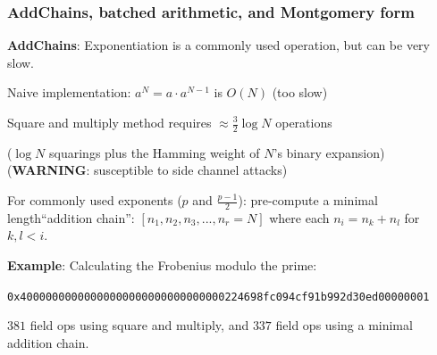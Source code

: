 \documentclass[options]{beamer}
\begin{document}
\begin{frame}[fragile]
    \frametitle{AddChains, batched arithmetic, and Montgomery form}

    {\bf AddChains}: Exponentiation is a commonly used operation, but can be very slow.

    Naive implementation: $a ^ N = a \cdot a^ {N -1}$ is $O(N)$ (too slow)

    \pause
    \vspace{6pt}

    Square and multiply method requires $\approx \frac{3}{2} \log N$ operations

    ($\log N$ squarings plus the Hamming weight of $N$'s binary expansion)
    ({\bf WARNING}: susceptible to side channel attacks)

    \pause
    \vspace{6pt}

    For commonly used exponents ($p$ and $\frac{p-1}{2}$): pre-compute a minimal length``addition chain'':
    $[n_1, n_2, n_3, ..., n_r = N]$ where each $n_i = n_k + n_l$ for $k, l < i$. 

    \pause
    \vspace{6pt}

    {\bf Example}: Calculating the Frobenius modulo the prime:
    \begin{small} \verb+0x40000000000000000000000000000000224698fc094cf91b992d30ed00000001+ \end{small}
    $381$ field ops using square and multiply, and $337$ field ops using a minimal addition chain.
\end{frame}
\end{document}
